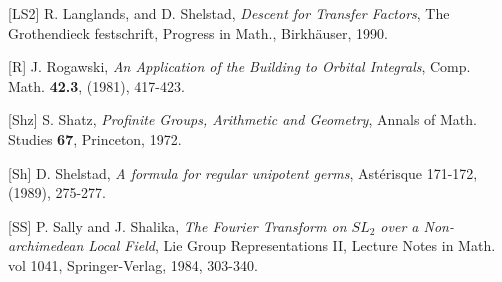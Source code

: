 \documentclass{amsart}
\begin{document}
{[LS2]  R. Langlands, and D.  Shelstad, {\it Descent for Transfer
Factors}, The Grothendieck festschrift, Progress in Math.,
Birkh\"auser, 1990.

[R]  J. Rogawski, {\it An Application of the Building to
Orbital Integrals}, Comp. Math. {\bf 42.3}, (1981), 417-423.

[Shz] S. Shatz, {\it Profinite Groups, Arithmetic and Geometry},
Annals of Math. Studies  {\bf 67}, Princeton, 1972.

[Sh]  D. Shelstad, {\it A formula for regular unipotent germs},
Ast\'erisque 171-172, (1989), 275-277.

[SS] P. Sally and J. Shalika, {\it The Fourier Transform on $SL_2$ over
 a Non-archimedean Local Field}, Lie Group Representations II,
Lecture Notes in Math. vol 1041, Springer-Verlag, 1984, 303-340.

}
\end{document}
